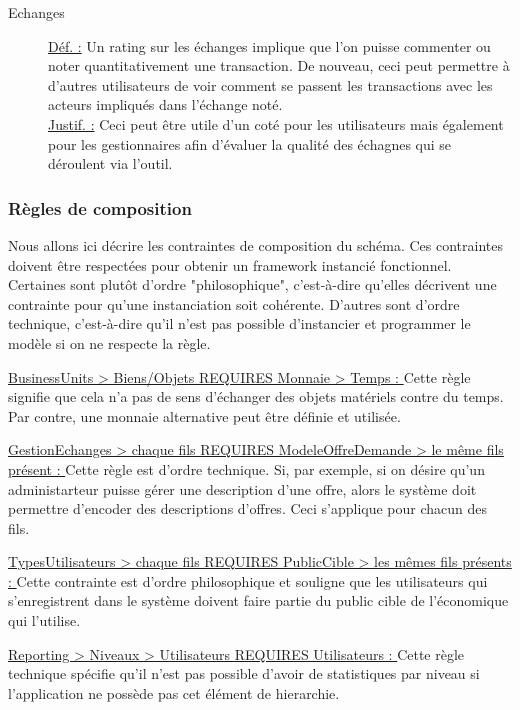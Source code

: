 \begin{description}
\item [Echanges]
\underline{Déf. :}  Un rating sur les échanges implique que l'on puisse commenter ou noter quantitativement une transaction.  De nouveau,  ceci peut permettre à d'autres utilisateurs de voir comment se passent les transactions avec les acteurs impliqués dans l'échange noté.
\\ \underline{Justif. :}  Ceci peut être utile d'un coté pour les utilisateurs mais également pour les gestionnaires afin d'évaluer la qualité des échagnes qui se déroulent via l'outil.
\newline

\end{description}

\subsubsection{Règles de composition}

Nous allons ici décrire les contraintes de composition du schéma.   Ces contraintes doivent être respectées pour obtenir un framework instancié fonctionnel.  Certaines sont plutôt d'ordre "philosophique",  c'est-à-dire qu'elles décrivent une contrainte pour qu'une instanciation soit cohérente.  D'autres sont d'ordre technique,  c'est-à-dire qu'il n'est pas possible d'instancier et programmer le modèle si on ne respecte la règle.

\underline{BusinessUnits > Biens/Objets REQUIRES Monnaie > Temps : } Cette règle  signifie que cela n'a pas de sens d'échanger des objets matériels contre du temps.  Par contre,  une monnaie alternative peut être définie et utilisée.

\underline{GestionEchanges > chaque fils REQUIRES ModeleOffreDemande > le même fils présent : }  Cette règle est d'ordre technique.  Si,  par exemple,  si on désire qu'un administarteur puisse gérer une description d'une offre,  alors le système doit permettre d'encoder des descriptions d'offres.  Ceci s'applique pour chacun des fils. 

\underline{TypesUtilisateurs > chaque fils REQUIRES PublicCible > les mêmes fils présents : }  Cette contrainte est d'ordre philosophique et souligne que les utilisateurs qui s'enregistrent dans le système doivent faire partie du public cible de l'économique qui l'utilise.

\underline{Reporting > Niveaux > Utilisateurs REQUIRES Utilisateurs : }  Cette règle technique spécifie qu'il n'est pas possible d'avoir de statistiques par niveau si l'application ne possède pas cet élément de  hierarchie.

